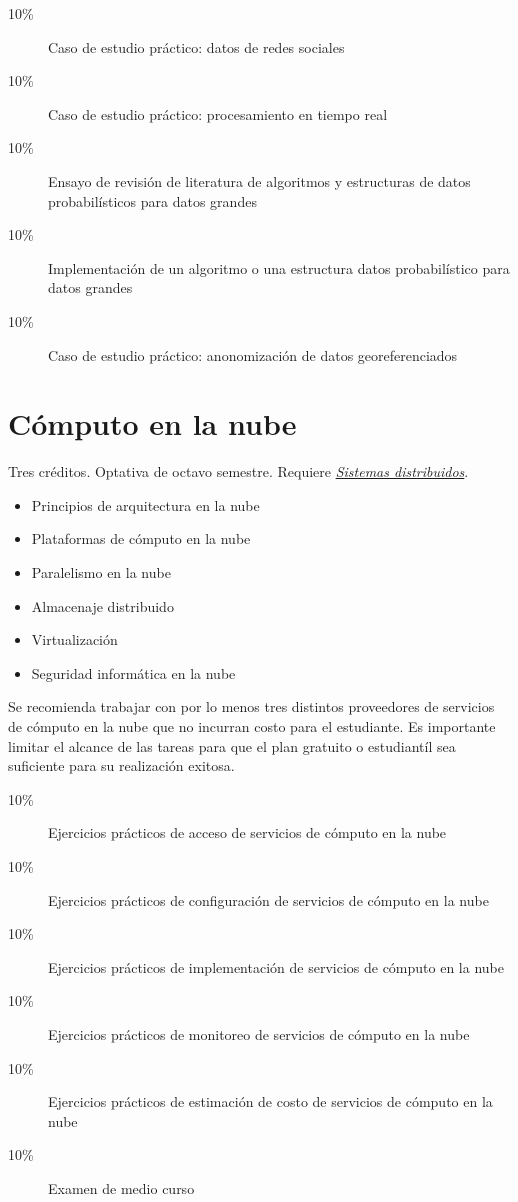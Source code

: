 \documentclass{article}
\begin{document}
\begin{multicols}{4}
\begin{description}
\item[10\%]{Caso de estudio pr\'{a}ctico: datos de redes sociales}
\item[10\%]{Caso de estudio pr\'{a}ctico: procesamiento en tiempo real}    
\item[10\%]{Ensayo de revisi\'{o}n de literatura de algoritmos y
  estructuras de datos probabil\'{i}sticos para datos grandes}
\item[10\%]{Implementaci\'{o}n de un algoritmo o una estructura datos
  probabil\'{i}stico para datos grandes}
\item[10\%]{Caso de estudio pr\'{a}ctico: anonomizaci\'{o}n de datos
  georeferenciados}
\end{description}  

\vfill\null \columnbreak

\hypertarget{celn}{\section*{C\'{o}mputo en la nube}} 

Tres cr\'{e}ditos. Optativa de octavo semestre. Requiere
\hyperlink{sdi}{\em Sistemas distribuidos}.

\begin{itemize}
\item{Principios de arquitectura en la nube}
\item{Plataformas de c\'{o}mputo en la nube}
\item{Paralelismo en la nube}
\item{Almacenaje distribuido}
\item{Virtualizaci\'{o}n}
\item{Seguridad inform\'{a}tica en la nube}
\end{itemize}

Se recomienda trabajar con por lo menos tres distintos proveedores de
servicios de c\'{o}mputo en la nube que no incurran costo para el
estudiante. Es importante limitar el alcance de las tareas para que el
plan gratuito o estudiant\'{i}l sea suficiente para su realizaci\'{o}n
exitosa.

\begin{description}
\item[10\%]{Ejercicios pr\'{a}cticos de acceso de servicios de c\'{o}mputo en
  la nube}
\item[10\%]{Ejercicios pr\'{a}cticos de configuraci\'{o}n de servicios de
  c\'{o}mputo en la nube}
\item[10\%]{Ejercicios pr\'{a}cticos de implementaci\'{o}n de servicios de
  c\'{o}mputo en la nube}
\item[10\%]{Ejercicios pr\'{a}cticos de monitoreo de servicios de c\'{o}mputo
  en la nube}
\item[10\%]{Ejercicios pr\'{a}cticos de estimaci\'{o}n de costo de servicios
  de c\'{o}mputo en la nube}
\item[10\%]{Examen de medio curso}  


\end{description}
\end{multicols}
\end{document}
